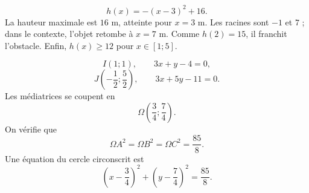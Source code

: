 \[
h(x)=-(x-3)^2+16.
\]
La hauteur maximale est $16$ m, atteinte pour $x=3$ m. Les racines sont
$-1$ et $7$ ; dans le contexte, l'objet retombe à $x=7$ m. Comme $h(2)=15$,
il franchit l'obstacle. Enfin, $h(x)\geq12$ pour $x\in[1;5]$.

\[
I(1;1),\qquad 3x+y-4=0,
\]
\[
J\left(-\frac12;\frac52\right),\qquad 3x+5y-11=0.
\]
Les médiatrices se coupent en
\[
\Omega\left(\frac34;\frac74\right).
\]
On vérifie que
\[
\Omega A^2=\Omega B^2=\Omega C^2=\frac{85}{8}.
\]
Une équation du cercle circonscrit est
\[
\left(x-\frac34\right)^2+\left(y-\frac74\right)^2=\frac{85}{8}.
\]

